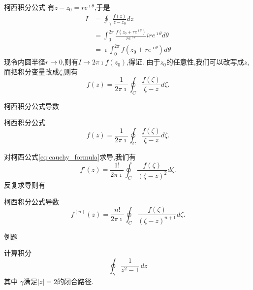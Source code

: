 \documentclass[fontset=windows, chinese, 10pt]{beamer}
\begin{document}
  \begin{frame}{柯西积分公式}
有$z-z_0 = re^{\imath \theta}$,于是
\begin{equation}
    \begin{aligned}
        I &= \oint_\gamma \frac{f(z)}{z-z_0} d z
        \\
        & = \int _0 ^{2\pi} \frac{f(z_0 + re^{\imath \theta})}{re^{\imath \theta}} ire^{\imath \theta} d\theta
        \\
        & = \imath \int _0 ^{2\pi} f(z_0 + re^{\imath \theta}) d\theta
    \end{aligned}
\end{equation}
现令内圆半径$r\to 0$,则有$I\to 2\pi\imath f(z_0)$,得证.
由于$z_0$的任意性,我们可以改写成$z$,而把积分变量改成$\zeta$,则有
      \[
    f(z) = \frac{1}{2\pi \imath} \oint_C \frac{f(\zeta)}{\zeta - z} d \zeta.
\]


  \end{frame}
  
  \begin{frame}{柯西积分公式导数}
    \begin{exampleblock}{柯西积分公式}
        \begin{equation}
            f(z) = \frac{1}{2\pi \imath} \oint_C \frac{f(\zeta)}{\zeta - z} d \zeta.
            \label{eq:cauchy_formula}
        \end{equation}
    \end{exampleblock}


对柯西公式\eqref{eq:cauchy_formula}求导,我们有
\begin{equation}
    f'(z) = \frac{1!}{2\pi \imath} \oint_C \frac{f(\zeta)}{(\zeta - z)^2} d \zeta.
    \label{eq:cauchy_formula_1st_derivative}
\end{equation}
反复求导则有
  
\begin{exampleblock}{柯西积分公式导数}
\begin{equation}
    f^{(n)}(z) = \frac{n!}{2\pi \imath} \oint_C \frac{f(\zeta)}{(\zeta - z)^{n+1}} d \zeta.
    \label{eq:cauchy_formula_nth_derivative}
\end{equation}
    \end{exampleblock}

  \end{frame}
  
\begin{frame}{例题}
 
\begin{example}
    计算积分 
    $$ 
    \oint_{\gamma} \frac{1}{z^2 - 1} \, dz  
    $$
    其中 $\gamma$满足$|z| = 2$的闭合路径.
\end{example}

\end{frame}
\end{document}
